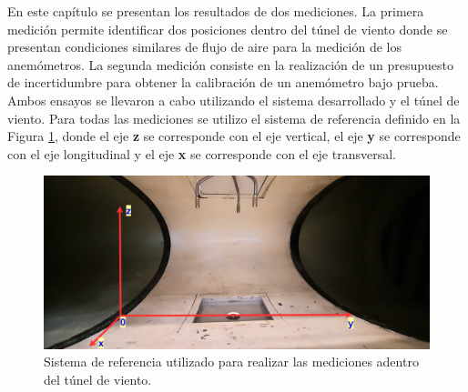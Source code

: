 



En este capítulo se presentan los resultados de dos mediciones. La primera medición permite identificar dos posiciones dentro del túnel de viento donde se presentan condiciones similares de flujo de aire para la medición de los anemómetros. La segunda medición consiste en la realización de un presupuesto de incertidumbre para obtener la calibración de un anemómetro bajo prueba. Ambos ensayos se llevaron a cabo utilizando el sistema desarrollado y el túnel de viento. Para todas las mediciones se utilizo el sistema de referencia definido en la Figura \ref{fig:sisReferenciaZmed}, donde el eje \textbf{z} se corresponde con el eje vertical, el eje \textbf{y} se corresponde con el eje longitudinal y el eje \textbf{x} se corresponde con el eje transversal.

\begin{figure}[H]
    \centering
    \includegraphics[width=0.8\linewidth]{Figuras/resultados/sisReferenciaZmed.png}
    \caption{Sistema de referencia utilizado para realizar las mediciones adentro del túnel de viento.}
    \label{fig:sisReferenciaZmed}
\end{figure}
